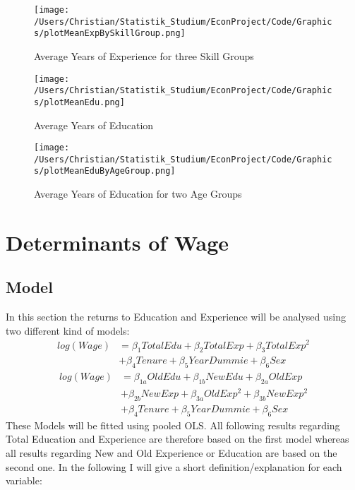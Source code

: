 \documentclass{article}
\begin{document}
\begin{figure}[!h]
    \centering
    \texttt{[image: /Users/Christian/Statistik\_Studium/EconProject/Code/Graphics/plotMeanExpBySkillGroup.png]}
    \caption{Average Years of Experience for three Skill Groups}
    \label{fig:MeanExpBySkillGroup}
\end{figure}

\begin{figure}[!h]
    \centering
    \texttt{[image: /Users/Christian/Statistik\_Studium/EconProject/Code/Graphics/plotMeanEdu.png]}
    \caption{Average Years of Education}
    \label{fig:MeanEdu}
\end{figure}

\begin{figure}[!h]
    \centering
    \texttt{[image: /Users/Christian/Statistik\_Studium/EconProject/Code/Graphics/plotMeanEduByAgeGroup.png]}
    \caption{Average Years of Education for two Age Groups}
    \label{fig:MeanEduByAgeGroup}
\end{figure}

\FloatBarrier
\section{Determinants of Wage}
\subsection{Model}
In this section the returns to Education and Experience will be analysed using two different kind of models:
\begin{equation}
	\begin{split}
	log(Wage) &= \beta_{1}TotalEdu + \beta_{2}TotalExp + \beta_{3} TotalExp^2\\
	&+\beta_{4}Tenure + \beta_{5}YearDummie + \beta_{6}Sex
	\end{split}
\end{equation}
\begin{equation} 
	\begin{split}
	log(Wage) &= \beta_{1a}OldEdu + \beta_{1b}NewEdu + \beta_{2a}OldExp \\
	&+ \beta_{2b}NewExp + \beta_{3a}OldExp^2 + \beta_{3b}NewExp^2\\
	&+\beta_{4}Tenure + \beta_{5}YearDummie + \beta_{6}Sex
	\end{split}
\end{equation}
These Models will be fitted using pooled OLS. All following results regarding Total Education and Experience are therefore based on the first model whereas all results regarding New and Old Experience or Education are based on the second one.
In the following I will give a short definition/explanation for each variable:
\end{document}
